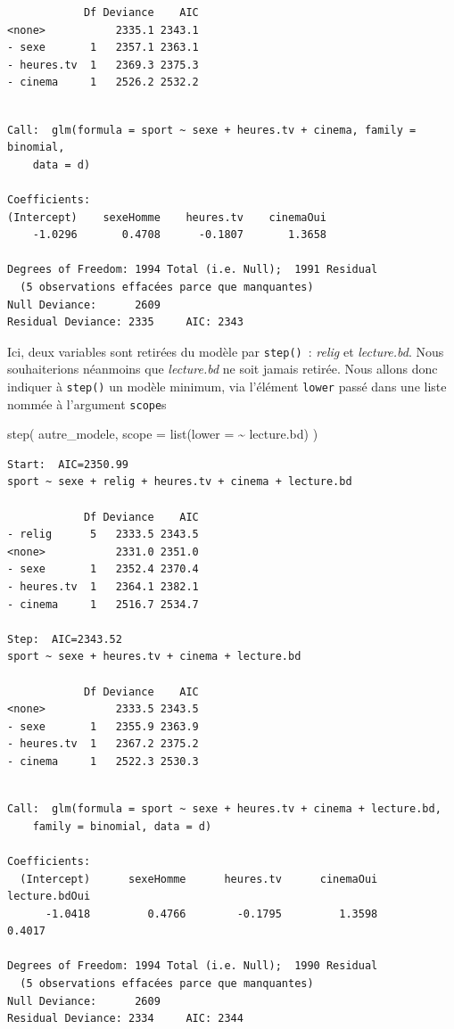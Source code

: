 \documentclass[
  letterpaper,
  DIV=11,
  numbers=noendperiod,
  oneside]{scrreprt}
\newenvironment{Shaded}{\begin{snugshade}}{\end{snugshade}}
\newcommand{\AttributeTok}[1]{\textcolor[rgb]{0.40,0.45,0.13}{#1}}
\newcommand{\FunctionTok}[1]{\textcolor[rgb]{0.28,0.35,0.67}{#1}}
\newcommand{\NormalTok}[1]{\textcolor[rgb]{0.00,0.23,0.31}{#1}}
\newcommand{\SpecialCharTok}[1]{\textcolor[rgb]{0.37,0.37,0.37}{#1}}
\begin{document}
\begin{tcolorbox}
\begin{verbatim}
            Df Deviance    AIC
<none>           2335.1 2343.1
- sexe       1   2357.1 2363.1
- heures.tv  1   2369.3 2375.3
- cinema     1   2526.2 2532.2
\end{verbatim}

\begin{verbatim}

Call:  glm(formula = sport ~ sexe + heures.tv + cinema, family = binomial, 
    data = d)

Coefficients:
(Intercept)    sexeHomme    heures.tv    cinemaOui  
    -1.0296       0.4708      -0.1807       1.3658  

Degrees of Freedom: 1994 Total (i.e. Null);  1991 Residual
  (5 observations effacées parce que manquantes)
Null Deviance:      2609 
Residual Deviance: 2335     AIC: 2343
\end{verbatim}

Ici, deux variables sont retirées du modèle par \texttt{step()}~:
\emph{relig} et \emph{lecture.bd}. Nous souhaiterions néanmoins que
\emph{lecture.bd} ne soit jamais retirée. Nous allons donc indiquer à
\texttt{step()} un modèle minimum, via l'élément \texttt{lower} passé
dans une liste nommée à l'argument \texttt{scope}s

\begin{Shaded}
\begin{Highlighting}[]
\FunctionTok{step}\NormalTok{(}
\NormalTok{  autre\_modele,}
  \AttributeTok{scope =} \FunctionTok{list}\NormalTok{(}\AttributeTok{lower =} \SpecialCharTok{\textasciitilde{}}\NormalTok{ lecture.bd)}
\NormalTok{)}
\end{Highlighting}
\end{Shaded}

\begin{verbatim}
Start:  AIC=2350.99
sport ~ sexe + relig + heures.tv + cinema + lecture.bd

            Df Deviance    AIC
- relig      5   2333.5 2343.5
<none>           2331.0 2351.0
- sexe       1   2352.4 2370.4
- heures.tv  1   2364.1 2382.1
- cinema     1   2516.7 2534.7

Step:  AIC=2343.52
sport ~ sexe + heures.tv + cinema + lecture.bd

            Df Deviance    AIC
<none>           2333.5 2343.5
- sexe       1   2355.9 2363.9
- heures.tv  1   2367.2 2375.2
- cinema     1   2522.3 2530.3
\end{verbatim}

\begin{verbatim}

Call:  glm(formula = sport ~ sexe + heures.tv + cinema + lecture.bd, 
    family = binomial, data = d)

Coefficients:
  (Intercept)      sexeHomme      heures.tv      cinemaOui  lecture.bdOui  
      -1.0418         0.4766        -0.1795         1.3598         0.4017  

Degrees of Freedom: 1994 Total (i.e. Null);  1990 Residual
  (5 observations effacées parce que manquantes)
Null Deviance:      2609 
Residual Deviance: 2334     AIC: 2344
\end{verbatim}

\end{tcolorbox}
\end{document}
